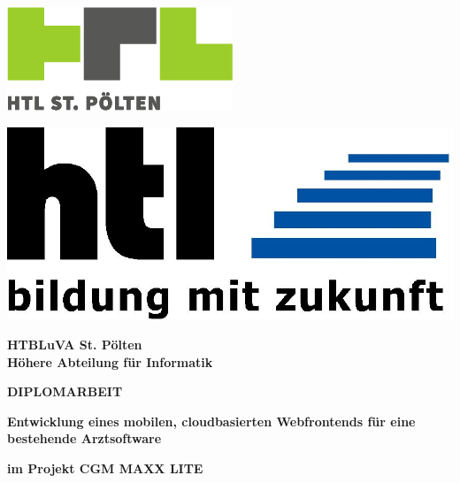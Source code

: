 \pagestyle{empty}
\singlespacing
\sffamily

\begin{flushleft}
	\includegraphics[scale=0.40]{images/HTLstp-RGB.png} \\
\end{flushleft}
\vspace{-2.5cm}
\begin{flushright}
	\includegraphics[scale=0.10]{images/HTL.jpg} \\
\end{flushright}

\vspace{-2.7cm}
\begin{center}
\textbf{HTBLuVA St. Pölten}\\
\textbf{Höhere Abteilung für Informatik}
\end{center}
\vspace{-0.7cm}
\hrulefill

\begin{center}
\vspace{2cm}
\huge
\textbf{DIPLOMARBEIT}

\huge
\textbf{Entwicklung eines mobilen, cloudbasierten Webfrontends für eine bestehende Arztsoftware}

\large
\textbf{im Projekt CGM MAXX LITE}
\end{center}

